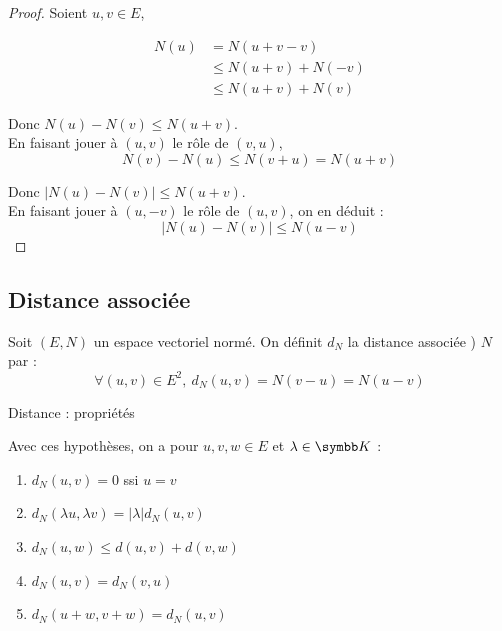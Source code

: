 
\begin{proof}
    Soient $u, v \in E$,

    \begin{align*}
    N(u) &= N(u + v - v) \\
         &\leqslant N(u + v) + N(-v) \\
         &\leqslant N(u + v) + N(v)
    \end{align*}

    Donc $N(u) - N(v) \leqslant N(u + v)$. \\

    En faisant jouer à $(u, v)$ le rôle de $(v, u)$, 
    \[N(v) - N(u) \leqslant N(v + u) = N(u + v)\]

    Donc $|N(u) - N(v)| \leqslant N(u + v)$. \\

    En faisant jouer à $(u, -v)$ le rôle de $(u, v)$, on en déduit : 
    \[|N(u) - N(v)| \leqslant N(u - v)\]
\end{proof}

\subsection{Distance associée}

\begin{definition}{}{}
    Soit $(E, N)$ un espace vectoriel normé.
    On définit $d_N$ la distance associée ) $N$ par :
    \[\forall (u, v) \in E^2,~ d_N(u, v) = N(v - u) = N(u - v)\]
\end{definition}

\begin{proposition}{Distance : propriétés}{}

    Avec ces hypothèses, on a pour $u, v, w \in E$ et $\lambda \in \K$ :

    \begin{enumerate}
        \item $d_N(u, v) = 0$ ssi $u = v$
        \item $d_N(\lambda u, \lambda v) = |\lambda| d_N(u, v)$
        \item $d_N(u, w) \leqslant d(u, v) + d(v, w)$
        \item $d_N (u, v) = d_N (v, u)$
        \item $d_N (u + w, v + w) = d_N (u, v)$
    \end{enumerate}
\end{proposition}

